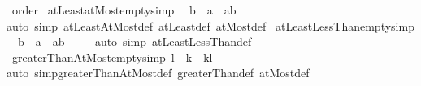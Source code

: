 \begin{isabellebody}
\isanewline
{}\isamarkupfalse%
\isanewline
\isanewline
{}\isamarkupfalse%
\ order\isanewline
{}\isanewline
\isanewline
{}\isamarkupfalse%
\ atLeastatMost{\isacharunderscore}{\kern0pt}empty{\isacharbrackleft}{\kern0pt}simp{\isacharbrackright}{\kern0pt}{\isacharcolon}{\kern0pt}\isanewline
\ \ {\isachardoublequoteopen}b\ {\isacharless}{\kern0pt}\ a\ {\isasymLongrightarrow}\ {\isacharbraceleft}{\kern0pt}a{\isachardot}{\kern0pt}{\isachardot}{\kern0pt}b{\isacharbraceright}{\kern0pt}\ {\isacharequal}{\kern0pt}\ {\isacharbraceleft}{\kern0pt}{\isacharbraceright}{\kern0pt}{\isachardoublequoteclose}\isanewline
%
\isadelimproof
\ \ %
\endisadelimproof
%
\isatagproof
{}\isamarkupfalse%
{\isacharparenleft}{\kern0pt}auto\ simp{\isacharcolon}{\kern0pt}\ atLeastAtMost{\isacharunderscore}{\kern0pt}def\ atLeast{\isacharunderscore}{\kern0pt}def\ atMost{\isacharunderscore}{\kern0pt}def{\isacharparenright}{\kern0pt}%
\endisatagproof
{\isafoldproof}%
%
\isadelimproof
\isanewline
%
\endisadelimproof
\isanewline
{}\isamarkupfalse%
\ atLeastLessThan{\isacharunderscore}{\kern0pt}empty{\isacharbrackleft}{\kern0pt}simp{\isacharbrackright}{\kern0pt}{\isacharcolon}{\kern0pt}\isanewline
\ \ {\isachardoublequoteopen}b\ {\isasymle}\ a\ {\isasymLongrightarrow}\ {\isacharbraceleft}{\kern0pt}a{\isachardot}{\kern0pt}{\isachardot}{\kern0pt}{\isacharless}{\kern0pt}b{\isacharbraceright}{\kern0pt}\ {\isacharequal}{\kern0pt}\ {\isacharbraceleft}{\kern0pt}{\isacharbraceright}{\kern0pt}{\isachardoublequoteclose}\isanewline
%
\isadelimproof
\ \ %
\endisadelimproof
%
\isatagproof
{}\isamarkupfalse%
{\isacharparenleft}{\kern0pt}auto\ simp{\isacharcolon}{\kern0pt}\ atLeastLessThan{\isacharunderscore}{\kern0pt}def{\isacharparenright}{\kern0pt}%
\endisatagproof
{\isafoldproof}%
%
\isadelimproof
\isanewline
%
\endisadelimproof
\isanewline
{}\isamarkupfalse%
\ greaterThanAtMost{\isacharunderscore}{\kern0pt}empty{\isacharbrackleft}{\kern0pt}simp{\isacharbrackright}{\kern0pt}{\isacharcolon}{\kern0pt}\ {\isachardoublequoteopen}l\ {\isasymle}\ k\ {\isacharequal}{\kern0pt}{\isacharequal}{\kern0pt}{\isachargreater}{\kern0pt}\ {\isacharbraceleft}{\kern0pt}k{\isacharless}{\kern0pt}{\isachardot}{\kern0pt}{\isachardot}{\kern0pt}l{\isacharbraceright}{\kern0pt}\ {\isacharequal}{\kern0pt}\ {\isacharbraceleft}{\kern0pt}{\isacharbraceright}{\kern0pt}{\isachardoublequoteclose}\isanewline
%
\isadelimproof
\ \ %
\endisadelimproof
%
\isatagproof
{}\isamarkupfalse%
{\isacharparenleft}{\kern0pt}auto\ simp{\isacharcolon}{\kern0pt}greaterThanAtMost{\isacharunderscore}{\kern0pt}def\ greaterThan{\isacharunderscore}{\kern0pt}def\ atMost{\isacharunderscore}{\kern0pt}def{\isacharparenright}{\kern0pt}%

\end{isabellebody}
